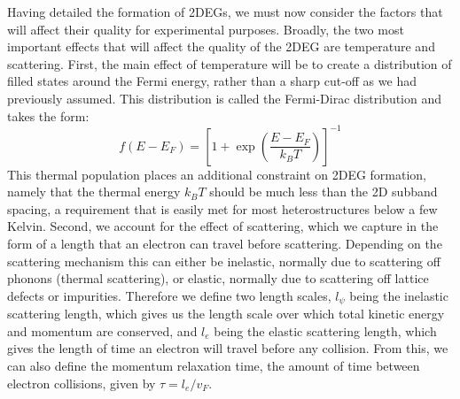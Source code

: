 Having detailed the formation of 2DEGs, we must now consider the factors that will affect their quality for
experimental purposes. Broadly, the two most important effects that will affect the quality of the
2DEG are temperature and scattering. First, the main effect of temperature will be to create a distribution of filled states around the Fermi energy, rather
than a sharp cut-off as we had previously assumed. This distribution is called the Fermi-Dirac distribution and takes the form:
\begin{equation}
  f(E - E_F) = \left[1 + \exp\left(\frac{E - E_F}{k_B T}\right)\right]^{-1}
\end{equation}
This thermal population places an additional constraint on 2DEG formation, namely that the thermal energy $k_B T$ should be much less than the
2D subband spacing, a requirement that is easily met for most heterostructures below a few Kelvin. Second, we account for the
effect of scattering, which we capture in the form of a length that an electron can travel before scattering. Depending on the scattering
mechanism this can either be inelastic, normally due to scattering off phonons (thermal scattering), or elastic, normally due to
scattering off lattice defects or impurities. Therefore we define two length scales, $l_\psi$ being the inelastic scattering length,
which gives us the length scale over which total kinetic energy and momentum are conserved, and $l_e$ being the elastic scattering
length, which gives the length of time an electron will travel before any collision. From this, we can also define the momentum relaxation time, the
amount of time between electron collisions, given by $\tau = l_e/v_F$.

